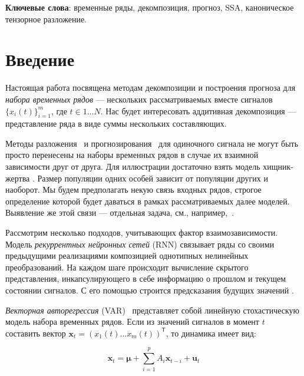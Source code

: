 	\textbf{Ключевые слова}: {\small временные ряды, декомпозиция, прогноз, SSA, каноническое тензорное разложение}.
	
	\vfill
	\hspace{0pt}
	
	\newpage
	
	
	\section{Введение}\label{Intro}
	
		Настоящая работа посвящена методам декомпозиции и построения прогноза для \textit{набора временных рядов} --- нескольких рассматриваемых вместе сигналов $ \{x_i(t)\}_{i=1}^m $, где $ t \in 1 \ldots N $. Нас будет интересовать аддитивная декомпозиция --- представление ряда в виде суммы нескольких составляющих.
		
		Методы разложения~\cite{enders2010applied, x11, cleveland90} и прогнозирования~\cite{3b1355aedd1041f1853e609a410576f3, enders2010applied, Box_Jenkins_methodology} для одиночного сигнала не могут быть просто перенесены на наборы временных рядов в случае их взаимной зависимости друг от друга. Для иллюстрации достаточно взять модель хищник-жертва \cite{Volterra:1928}. Размер популяции одних особей зависит от популяции других и наоборот. Мы будем предполагать некую связь входных рядов, строгое определение которой будет даваться в рамках рассматриваемых далее моделей. Выявление же этой связи --- отдельная задача, см., например,~\cite{702ab909-8cb1-3c30-a5f1-ab4517d6cf1c, 2012Sci...338..496S}.
		
		Рассмотрим несколько подходов, учитывающих фактор взаимозависимости. Модель \textit{рекуррентных нейронных сетей} (RNN) \cite{neco, TEALAB2018334} связывает ряды со своими предыдущими реализациями композицией однотипных нелинейных преобразований. На каждом шаге происходит вычисление скрытого представления, инкапсулирующего в себе информацию о прошлом и текущем состоянии сигналов. С его помощью строится предсказания будущих значений \cite{ZHANG2023143, HEWAMALAGE2021388}. 
		
		\textit{Векторная авторегрессия} (VAR)~\cite{VAR_model1, doi:10.1080/01621459.1962.10480664} представляет собой линейную стохастическую модель набора временных рядов. Если из значений сигналов в момент $ t $ составить вектор $ \mathbf{x}_t = (x_1(t) \ldots x_m(t))^{\mathsf{T}} $, то динамика имеет вид:
		
		\begin{equation*}
			\mathbf{x}_t = \boldsymbol{\mu} + \sum\limits_{i = 1}^p A_i \mathbf{x}_{t - i} + \mathbf{u}_t
		\end{equation*}
		
